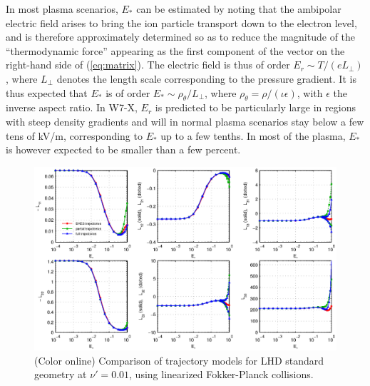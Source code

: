\documentclass[12pt]{revtex4}
\begin{document}
In most plasma scenarios, $E_*$ can be estimated by noting that the
ambipolar electric field arises to bring the ion particle transport
down to the electron level, and is therefore approximately determined so 
as to reduce the magnitude of the ``thermodynamic
force'' appearing as the first component of the vector on the
right-hand side of (\ref{eq:matrix}). The electric field is thus of
order $E_r \sim T/(eL_\perp)$, where $L_\perp$ denotes the length
scale corresponding to the pressure gradient. It is thus expected that $E_*$
is of order $E_* \sim \rho_\theta / L_\perp$, where $\rho_{\theta} =
\rho / (\iota \epsilon)$, with $\epsilon$ the inverse aspect ratio. In
W7-X, $E_r$ is predicted to be particularly large in regions with
steep density gradients and will in normal plasma scenarios stay below
a few tens of kV/m, corresponding to $E_*$ up to a few tenths\cite{Turkin}.
In most of the plasma, $E_*$ is however expected to be smaller than a few percent.




\begin{figure}[h!]
\includegraphics{m20131202_01_plotSFINCSErComparisonForPaper_LHD.eps}
\caption{(Color online) Comparison of trajectory models for LHD standard geometry at $\nu' = 0.01$,
using linearized Fokker-Planck collisions.
\label{fig:ErComparison_LHD}}
\end{figure}
\end{document}
